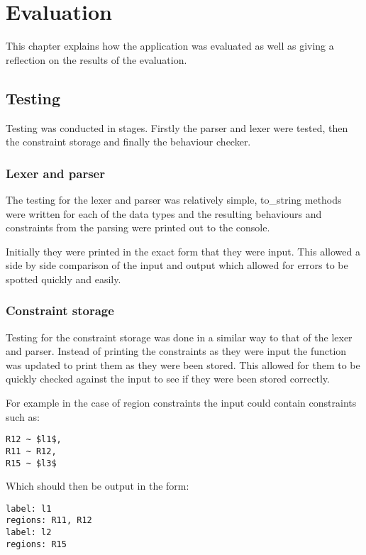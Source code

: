 \chapter{Evaluation} \label{chaptest}

This chapter explains how the application was evaluated as well as giving a reflection on the results of the evaluation.

\section{Testing}

Testing was conducted in stages. Firstly the parser and lexer were tested, then the constraint storage and finally the behaviour checker.

\subsection{Lexer and parser}

The testing for the lexer and parser was relatively simple, to_string methods were written for each of the data types and the resulting behaviours and constraints from the parsing were printed out to the console. 

Initially they were printed in the exact form that they were input. This allowed a side by side comparison of the input and output which allowed for errors to be spotted quickly and easily. 

\subsection{Constraint storage}

Testing for the constraint storage was done in a similar way to that of the lexer and parser. Instead of printing the constraints as they were input the function was updated to print them as they were been stored. This allowed for them to be quickly checked against the input to see if they were been stored correctly. 

For example in the case of region constraints the input could contain constraints such as: 

\begin{lstlisting}
R12 ~ $l1$, 
R11 ~ R12,
R15 ~ $l3$
\end{lstlisting}

Which should then be output in the form: 

\begin{lstlisting}
label: l1
regions: R11, R12
label: l2
regions: R15
\end{lstlisting}

